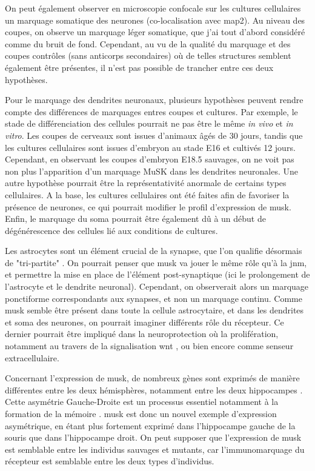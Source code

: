On peut également observer en microscopie confocale sur les cultures cellulaires un marquage somatique des neurones (co-localisation avec \gls{map2}). Au niveau des coupes, on observe un marquage léger somatique, que j'ai tout d'abord considéré comme du bruit de fond. Cependant, au vu de la qualité du marquage et des coupes contrôles (sans anticorps secondaires) où de telles structures semblent également être présentes, il n'est pas possible de trancher entre ces deux hypothèses.

Pour le marquage des dendrites neuronaux, plusieurs hypothèses peuvent rendre compte des différences de marquages entres coupes et cultures. Par exemple, le stade de différenciation des cellules pourrait ne pas être le même \emph{in vivo} et \emph{in vitro}. Les coupes de cerveaux sont issues d'animaux âgés de 30 jours, tandis que les cultures cellulaires sont issues d'embryon au stade E16 et cultivés 12 jours. Cependant, en observant les coupes d’embryon E18.5 sauvages, on ne voit pas non plus l’apparition d’un marquage MuSK dans les dendrites neuronales. Une autre hypothèse pourrait être la représentativité anormale de certains types cellulaires. A la base, les cultures cellulaires ont été faites afin de favoriser la présence de neurones, ce qui pourrait modifier le profil d'expression de \gls{musk}. Enfin, le marquage du soma pourrait être également dû à un début de dégénérescence des cellules lié aux conditions de cultures.

Les astrocytes sont un élément crucial de la synapse, que l'on qualifie désormais de "tri-partite" \cite{Araque1999, Perea2009}. On pourrait penser que \gls{musk} va jouer le même rôle qu'à la \gls{jnm}, et permettre la mise en place de l'élément post-synaptique (ici le prolongement de l'astrocyte et le dendrite neuronal). Cependant, on observerait alors un marquage ponctiforme correspondants aux synapses, et non un marquage continu. Comme \gls{musk} semble être présent dans toute la cellule astrocytaire, et dans les dendrites et soma des neurones, on pourrait imaginer différents rôle du récepteur. Ce dernier pourrait être impliqué dans la neuroprotection où la prolifération, notamment au travers de la signalisation \Gls{wnt} \cite{Toledo2008, Cerpa2009}, ou bien encore comme senseur extracellulaire.

Concernant l'expression de \gls{musk}, de nombreux gènes sont exprimés de manière différentes entre les deux hémisphères, notamment entre les deux hippocampes \cite{Moskal2006}. Cette asymétrie Gauche-Droite est un processus essentiel notamment à la formation de la mémoire \cite{Shimbo2018}. \gls{musk} est donc un nouvel exemple d'expression asymétrique, en étant plus fortement exprimé dans l'hippocampe gauche de la souris que dans l'hippocampe droit. On peut supposer que l'expression de \gls{musk} est semblable entre les individus sauvages et mutants, car l'immunomarquage du récepteur est semblable entre les deux types d'individus.

